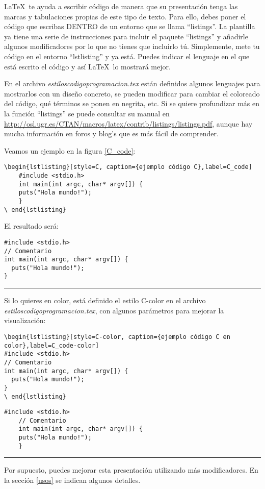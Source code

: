 \LaTeX~te ayuda a escribir código de manera que su presentación tenga las marcas y tabulaciones propias de este tipo de texto. Para ello, debes poner el código que escribas DENTRO de un entorno  que se llama ``listings''.  La plantilla ya tiene una serie de instrucciones para incluir el paquete ``listings'' y añadirle algunos modificadores por lo que no tienes que incluirlo tú. Simplemente, mete tu código en el entorno ``lstlisting'' y ya está. Puedes indicar el lenguaje en el que está escrito el código y así \LaTeX~lo mostrará mejor. 
\\
\par En el archivo \textit{estiloscodigoprogramacion.tex} están definidos algunos lenguajes para mostrarlos con un diseño concreto, se pueden modificar para cambiar el coloreado del código, qué términos se ponen en negrita, etc.
Si se quiere profundizar más en la función ``listings'' se puede consultar su manual en \url{http://osl.ugr.es/CTAN/macros/latex/contrib/listings/listings.pdf}, aunque hay mucha información en foros y blog's que es más fácil de comprender.

\par Veamos un ejemplo en la figura \ref{C_code}:

\begin{lstlisting}[style=Latex-color]
\begin{lstlisting}[style=C, caption={ejemplo código C},label=C_code]
	#include <stdio.h>
	int main(int argc, char* argv[]) {
  	puts("Hola mundo!");
	}
\ end{lstlisting}	
\end{lstlisting}

El resultado será:
\begin{lstlisting}[style=C, caption={ejemplo código C},label=C_code]
#include <stdio.h>
// Comentario
int main(int argc, char* argv[]) {
  puts("Hola mundo!");
}
\end{lstlisting}
\vspace{1em}
\noindent\hrule
\vspace{1em}
Si lo quieres en color, está definido el estilo C-color en el archivo \textit{estiloscodigoprogramacion.tex}, con algunos parámetros para mejorar la visualización:
\begin{lstlisting}[style=Latex-color]
\begin{lstlisting}[style=C-color, caption={ejemplo código C en color},label=C_code-color]
#include <stdio.h>
// Comentario
int main(int argc, char* argv[]) {
  puts("Hola mundo!");
}
\ end{lstlisting}
\end{lstlisting}
\begin{lstlisting}[style=C-color, caption={ejemplo código C en color},label=C_code-color]
	#include <stdio.h>
	// Comentario
	int main(int argc, char* argv[]) {
  	puts("Hola mundo!");
	}
\end{lstlisting}
\vspace{1em}
\noindent\hrule
\vspace{1em}
Por supuesto, puedes mejorar esta presentación utilizando más modificadores. En la sección \ref{usos} se indican algunos detalles.


